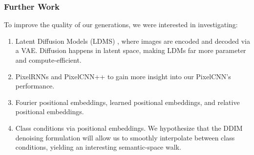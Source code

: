 \documentclass[10pt,twocolumn,letterpaper]{article}
\begin{document}
\subsubsection{Further Work}
To improve the quality of our generations,  we were interested in investigating:
\begin{enumerate}
    \item Latent Diffusion Models (LDMS) \cite{LDMs}, where images are encoded and decoded via a VAE. Diffusion happens in latent space, making LDMs far more parameter and compute-efficient.
    \item PixelRNNs \cite{pixelrnn} and PixelCNN++ \cite{Salimans2017PixeCNN} to gain more insight into our PixelCNN's performance.
    \item Fourier positional embeddings, learned positional embeddings, and relative positional embeddings. 
    \item Class conditions via positional embeddings. We hypothesize that the DDIM denoising formulation will allow us to smoothly interpolate between class conditions, yielding an interesting semantic-space walk.
\end{enumerate}
 


\newpage
{\small


}
\newpage
\end{document}
